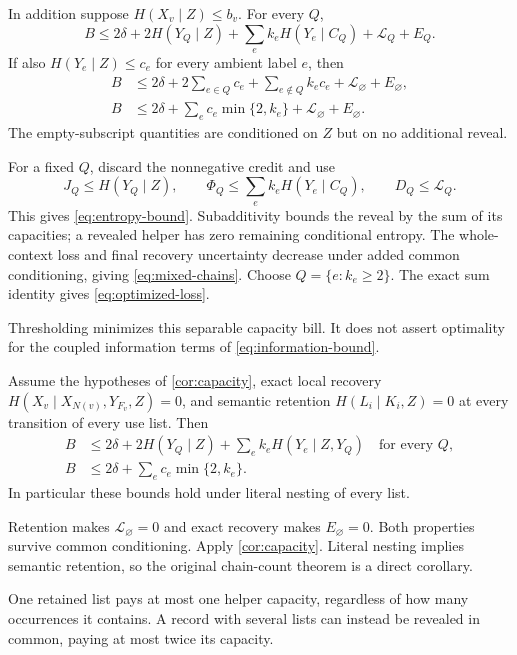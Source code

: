 \begin{corollary}\label{cor:capacity}
In addition suppose $H(X_v\mid Z)\le b_v$. For every $Q$,
\begin{equation}
B\le2\delta+2H(Y_Q\mid Z)
       +\sum_e k_eH(Y_e\mid C_Q)+\mathcal L_Q+E_Q.
\label{eq:entropy-bound}
\end{equation}
If also $H(Y_e\mid Z)\le c_e$ for every ambient label $e$, then
\begin{align}
B&\le2\delta+2\sum_{e\in Q}c_e+\sum_{e\notin Q}k_ec_e
                      +\mathcal L_{\varnothing}+E_{\varnothing},
\label{eq:mixed-chains}\\
B&\le2\delta+\sum_e c_e\min\{2,k_e\}
                      +\mathcal L_{\varnothing}+E_{\varnothing}.
\label{eq:optimized-loss}
\end{align}
The empty-subscript quantities are conditioned on $Z$ but on no
additional reveal.
\end{corollary}
\begin{outline}
For a fixed $Q$, discard the nonnegative credit and use
\[
J_Q\le H(Y_Q\mid Z),\qquad
\Phi_Q\le\sum_e k_eH(Y_e\mid C_Q),\qquad
D_Q\le\mathcal L_Q.
\]
This gives \eqref{eq:entropy-bound}. Subadditivity bounds the reveal
by the sum of its capacities; a revealed helper has zero remaining
conditional entropy. The whole-context loss and final recovery
uncertainty decrease under added common conditioning, giving
\eqref{eq:mixed-chains}. Choose $Q=\{e:k_e\ge2\}$. The exact
sum identity  gives \eqref{eq:optimized-loss}.
\end{outline}
Thresholding minimizes this separable capacity bill. It does not
assert optimality for the coupled information terms of
\eqref{eq:information-bound}.

\begin{corollary}\label{cor:retained-cover}
Assume the hypotheses of \cref{cor:capacity}, exact local recovery
$H(X_v\mid X_{N(v)},Y_{F_v},Z)=0$, and semantic retention
$H(L_i\mid K_i,Z)=0$ at every transition of every use list. Then
\begin{align*}
B&\le2\delta+2H(Y_Q\mid Z)+\sum_e k_eH(Y_e\mid Z,Y_Q)
\quad\text{for every }Q,\\
B&\le2\delta+\sum_e c_e\min\{2,k_e\}.
\end{align*}
In particular these bounds hold under literal nesting of every list.
\end{corollary}
\begin{outline}
Retention makes $\mathcal L_{\varnothing}=0$ and exact recovery makes
$E_{\varnothing}=0$. Both properties survive common conditioning.
Apply \cref{cor:capacity}. Literal nesting implies semantic retention,
so the original chain-count theorem is a direct corollary.
\end{outline}
One retained list pays at most one helper capacity, regardless of how
many occurrences it contains. A record with several lists can instead
be revealed in common, paying at most twice its capacity.


